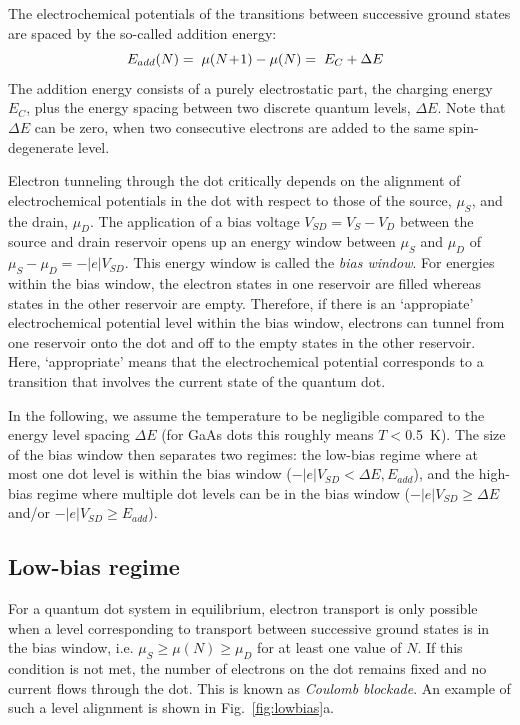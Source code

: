 \documentclass[12pt,aps,nofootinbib]{revtex4-1}
\begin{document}
The electrochemical potentials of the transitions between
successive ground states are spaced by the so-called addition
energy:
\begin{equation}
E_{add}(N) = \hspace{0.1cm} \mu(N\!+\!1) - \mu(N) = \hspace{0.1cm}
E_C + \Delta E \ \ \label{addition}
\end{equation}
\noindent The addition energy consists of a purely electrostatic
part, the charging energy $E_C$, plus the energy spacing between
two discrete quantum levels, $\Delta E$. Note that $\Delta E$ can
be zero, when two consecutive electrons are added to the same
spin-degenerate level.

Electron tunneling through the dot critically depends on the
alignment of electrochemical potentials in the dot with respect to
those of the source, $\mu_S$, and the drain, $\mu_D$. The
application of a bias voltage $V_{SD}=V_{S}-V_{D}$ between the
source and drain reservoir opens up an energy window between
$\mu_S$ and $\mu_D$ of  $\mu_S -\mu_D=-|e|V_{SD}$. This energy
window is called the \textit{bias window}. For energies within the
bias window, the electron states in one reservoir are filled
whereas states in the other reservoir are empty. Therefore, if
there is an `appropiate' electrochemical potential level within the
bias window, electrons can tunnel from one reservoir onto the dot
and off to the empty states in the other reservoir. Here, `appropriate' means that the electrochemical potential corresponds to a transition that involves the current state of the quantum dot.

In the following, we assume the temperature to be negligible
compared to the energy level spacing $\Delta E$ (for GaAs dots
this roughly means $T<$0.5~K). The size of the bias window then
separates two regimes: the low-bias regime where at most one dot
level is within the bias window ($-|e|V_{SD} < \Delta E,
E_{add}$), and the high-bias regime where multiple dot levels can
be in the bias window ($-|e|V_{SD}\ge\Delta E$ and/or
$-|e|V_{SD}\ge E_{add}$).

\subsection{Low-bias regime}
For a quantum dot system in equilibrium, electron transport is
only possible when a level corresponding to transport between
successive ground states is in the bias window, i.e. $\mu_S \geq
\mu(N) \geq \mu_D$ for at least one value of $N$. If this
condition is not met, the number of electrons on the dot remains
fixed and no current flows through the dot. This is known as
\textit{Coulomb blockade}. An example of such a level alignment is
shown in Fig.~\ref{fig:lowbias}a.
\end{document}
